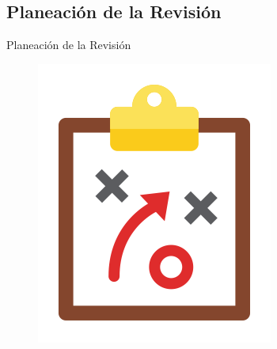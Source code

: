 \documentclass{beamer}
\begin{document}
\subsection{Planeación de la Revisión}
\begin{frame}
\Huge{\centerline{Planeación de la Revisión}}
	\begin{figure}
		\begin{center}
			\includegraphics[scale=.4]{images/2icons/plan.png}
		\end{center}
	\end{figure}
\end{frame}
\end{document}
